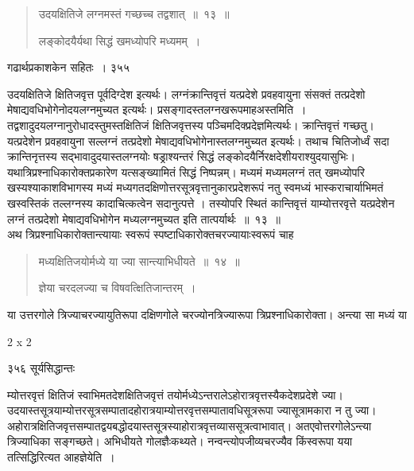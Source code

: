 \documentclass[11pt, openany]{book}
\begin{document}

 \begin{quote}
{\ssi उदयक्षितिजे लग्नमस्तं गच्छच्च तद्वशात्~॥~१३~॥
 
लङ्कोदयैर्यथा सिद्धं खमध्योपरि मध्यमम्~।}
%
\end{quote}

\newpage


 \hspace{3cm} गढार्थप्रकाशकेन सहितः~। \hfill ३५५ 
\vspace{1cm}


 उदयक्षितिजे क्षितिजवृत्त पूर्वदिग्देश इत्यर्थः। लग्नंक्रान्तिवृत्तं यत्प्रदेशे प्रवहवायुना संसक्तं तत्प्रदेशो मेषाद्यवधिभोगेनोदयलग्नमुच्यत इत्यर्थः। प्रसङ्गादस्तलग्नखरूपमाह\textendash अस्तमिति~। तद्वशादुदयलग्नानुरोधादस्तुमस्तक्षितिजं क्षितिजवृत्तस्य पञ्चिमदिक्प्रदेज्ञमित्यर्थः। क्रान्तिवृत्तं गच्छतु।यत्प्रदेशेन प्रवहवायुना सल्लग्नं तत्प्रदेशो मेषाद्यवधिभोगेनास्तलग्नमुच्यत इत्यर्थः। तथाच चितिजोर्ध्वं सदा क्रान्तिनृत्तस्य सद्भावादुदयास्तलग्नयोः षड्राश्यन्तरं सिद्धं लङ्कोदयैर्निरक्षदेशीयराश्युदयासुभिः। यथात्रिप्रश्नाधिकारोक्तप्रकारेण यत्सङ्ख्यामितं सिद्धं निष्पन्नम्। मध्यमं मध्यमलग्नं तत् खमध्योपरि खस्यश्याकाशविभागस्य मध्यं मध्यगतदक्षिणोत्तरसूत्रवृत्तानुकारप्रदेशरूपं नतु स्वमध्यं भास्कराचार्याभिमतं खस्वस्तिकं तल्लग्नस्य कादाचित्कत्वेन सदानुत्पत्ते  । तस्योपरि स्थितं कान्तिवृत्तं याम्योत्तरवृत्ते यत्प्रदेशेन लग्नं तत्प्रदेशो मेषाद्यवधिभोगेन मध्यलग्नमुच्यत इति तात्पर्यार्थः~॥~१३~॥ \\
\noindent अथ त्रिप्रश्नाधिकारोक्तान्त्यायाः स्वरूपं स्पष्टाधिकारोक्तचरज्यायाःस्वरूपं चाह \textendash


\begin{quote}
{\ssi मध्यक्षितिजयोर्मध्ये या ज्या सान्त्याभिधीयते~॥~१४~॥ 
 
ज्ञेया चरदलज्या च विषवत्क्षितिजान्तरम्~। }
\end{quote}
 या उत्तरगोले त्रिज्याचरज्यायुतिरूपा दक्षिणगोले चरज्योनत्रिज्यारूपा त्रिप्रश्नाधिकारोक्ता। अन्त्या सा मध्यं या\textendash

{\tiny{2 x 2}}

\newpage



\noindent ३५६ \hspace{4cm} सूर्यसिद्धान्तः
\vspace{1cm}


\noindent म्योत्तरवृत्तं क्षितिजं स्वाभिमतदेशक्षितिजवृत्तं तयोर्मध्येऽन्तरालेऽहोरात्रवृत्तस्यैकदेशप्रदेशे ज्या। उदयास्तसूत्रयाम्योत्तरसूत्रसम्पातादहोरात्रयाम्योत्तरवृत्तसम्पातावधिसूत्ररूपा ज्यासूत्रामकारा न तु ज्या। अहोरात्रक्षितिजवृत्तसम्पातद्वयबद्धोदयास्तसूत्रस्याहोरात्रवृत्तव्याससूत्रत्वाभावात्। अतएवोत्तरगोलेऽन्त्या त्रिज्याधिका सङ्गच्छते। अभिधीयते गोलज्ञैःकथ्यते। नन्वन्त्योपजीव्यचरज्यैव किंस्वरूपा यया तत्सिद्धिरित्यत आह\textendash  ज्ञेयेति~। 
\end{document}
